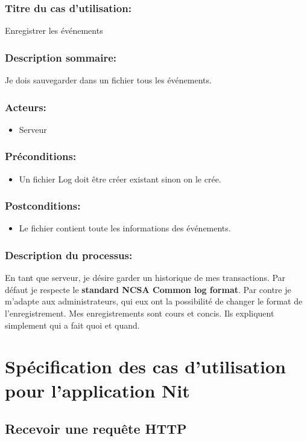 \documentclass{scrreprt}
\begin{document}
\subsubsection{Titre du cas d'utilisation:} Enregistrer les événements
\subsubsection{Description sommaire:}Je dois sauvegarder dans un fichier tous les événements.
\subsubsection{Acteurs:}
\begin{itemize}
    \item Serveur
\end{itemize}
\subsubsection{Préconditions:}
\begin{itemize}
    \item  Un fichier Log doit être créer existant sinon on le crée.
\end{itemize} 
\subsubsection{Postconditions:}
\begin{itemize}
    \item  Le fichier contient toute les informations des événements.
\end{itemize} 
\subsubsection{Description du processus:}En tant que serveur, je désire garder un historique de mes transactions. Par
défaut je respecte le \textbf{standard NCSA Common log format}\cite{NCSA}. Par contre je m'adapte
aux administrateurs, qui eux ont la possibilité de changer le format de
l'enregistrement. Mes enregistrements sont cours et concis. Ils expliquent
simplement qui a fait quoi et quand.

\section{Spécification des cas d'utilisation pour l'application Nit}
\subsection{Recevoir une requête HTTP}
\end{document}
